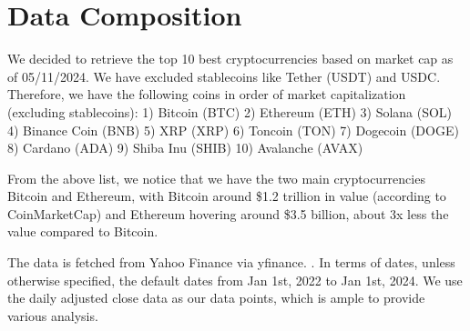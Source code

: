 \section{Data Composition}

We decided to retrieve the top 10 best cryptocurrencies based on market cap as of 05/11/2024. We have excluded stablecoins like Tether (USDT) and USDC. Therefore, we have the following coins in order of market capitalization (excluding stablecoins): 
1) Bitcoin (BTC)
2) Ethereum (ETH)
3) Solana (SOL)
4) Binance Coin (BNB)
5) XRP (XRP)
6) Toncoin (TON)
7) Dogecoin (DOGE)
8) Cardano (ADA)
9) Shiba Inu (SHIB)
10) Avalanche (AVAX)

From the above list, we notice that we have the two main cryptocurrencies Bitcoin and Ethereum, with Bitcoin around \$1.2 trillion in value (according to CoinMarketCap) and Ethereum hovering around \$3.5 billion, about 3x less the value compared to Bitcoin.

The data is fetched from Yahoo Finance via yfinance. \cite{yfinance}. In terms of dates, unless otherwise specified, the default dates from Jan 1st, 2022 to Jan 1st, 2024. We use the daily adjusted close data as our data points, which is ample to provide various analysis.